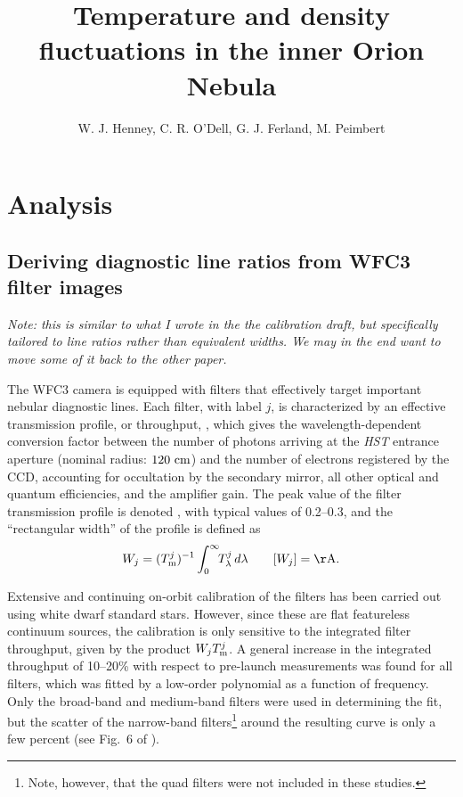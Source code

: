 \documentclass[preprint]{aastex}
\begin{document}
\title{Temperature and density fluctuations in the inner Orion Nebula}
\author{W. J. Henney, C. R. O'Dell, G. J. Ferland, M. Peimbert}
\section{Analysis}
\label{sec:fluct}



\subsection{Deriving diagnostic line ratios from WFC3 filter images}
\label{sec:filters}

\textit{Note: this is similar to what I wrote in the the calibration
  draft, but specifically tailored to line ratios rather than
  equivalent widths.  We may in the end want to move some of it back
  to the other paper.}

The WFC3 camera is equipped with filters that effectively target
important nebular diagnostic lines.  Each filter, with label \(j\), is
characterized by an effective transmission profile, or throughput,
, which gives the wavelength-dependent conversion factor
between the number of photons arriving at the \textit{HST} entrance
aperture (nominal radius: \(120\ \mathrm{cm}\)) and the number of electrons
registered by the CCD, accounting for occultation by the secondary
mirror, all other optical and quantum efficiencies, and the amplifier
gain.  The peak value of the filter transmission profile is denoted
, with typical values of 0.2--0.3, and the ``rectangular
width'' of the profile is defined as
\begin{equation}
  \label{eq:width}
  W_j = (\Tmax{j})^{-1} \int_0^\infty \!\!\Tlam{j}\, d\lambda 
  \quad\quad [W_j] = \U{\AA}.
\end{equation}


Extensive and continuing on-orbit calibration of the filters has been
carried out \citep{Kalirai:2009a, Kalirai:2010a, Sabbi:2013b} using
white dwarf standard stars.  However, since these are flat featureless
continuum sources, the calibration is only sensitive to the integrated
filter throughput, given by the product \(W_j T_{\mathrm{m}}^{j}\).  A general
increase in the integrated throughput of 10--20\% with respect to
pre-launch measurements was found for all filters, which was fitted by
a low-order polynomial as a function of frequency.  Only the
broad-band and medium-band filters were used in determining the fit,
but the scatter of the narrow-band filters\footnote{Note, however,
  that the quad filters were not included in these studies.} around
the resulting curve is only a few percent (see Fig.~6 of
\citealp{Kalirai:2009a}).
\end{document}
